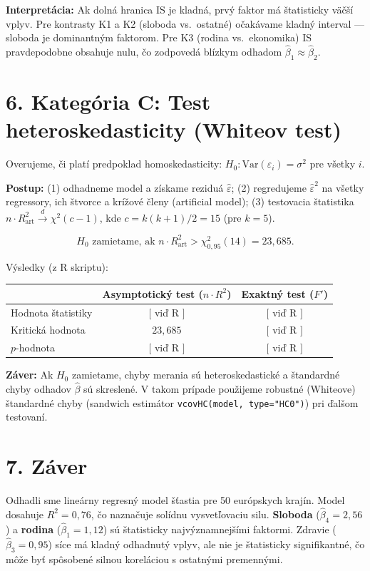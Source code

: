 \documentclass[12pt,a4paper]{article}
\begin{document}
\textbf{Interpretácia:} Ak dolná hranica IS je kladná, prvý faktor
má štatisticky väčší vplyv. Pre kontrasty K1 a K2 (sloboda vs.\ ostatné)
očakávame kladný interval --- sloboda je dominantným faktorom.
Pre K3 (rodina vs.\ ekonomika) IS pravdepodobne obsahuje nulu,
čo zodpovedá blízkym odhadom $\hat{\beta}_1 \approx \hat{\beta}_2$.

\section*{6. Kategória C: Test heteroskedasticity (Whiteov test)}

Overujeme, či platí predpoklad homoskedasticity:
$H_0\colon \mathrm{Var}(\varepsilon_i) = \sigma^2$ pre všetky $i$.

\textbf{Postup:} (1) odhadneme model a získame reziduá $\hat{\varepsilon}$;
(2) regredujeme $\hat{\varepsilon}^2$ na všetky regressory, ich štvorce
a krížové členy (artificial model); (3) testovacia štatistika
$n \cdot R^2_{\text{art}} \xrightarrow{d} \chi^2(c-1)$,
kde $c = k(k+1)/2 = 15$ (pre $k=5$).

\[
  H_0\text{ zamietame, ak } n \cdot R^2_{\text{art}} > \chi^2_{0{,}95}(14) = 23{,}685.
\]

Výsledky (z R skriptu):

\medskip
\begin{tabular}{lcc}
\toprule
& Asymptotický test ($n \cdot R^2$) & Exaktný test ($F'$) \\
\midrule
Hodnota štatistiky & $[$ viď R $]$ & $[$ viď R $]$ \\
Kritická hodnota   & $23{,}685$ & $[$ viď R $]$ \\
$p$-hodnota        & $[$ viď R $]$ & $[$ viď R $]$ \\
\bottomrule
\end{tabular}

\medskip
\textbf{Záver:} Ak $H_0$ zamietame, chyby merania sú heteroskedastické
a štandardné chyby odhadov $\hat{\beta}$ sú skreslené.
V takom prípade použijeme robustné (Whiteove) štandardné chyby
(sandwich estimátor \texttt{vcovHC(model, type="HC0")}) pri ďalšom testovaní.

\section*{7. Záver}

Odhadli sme lineárny regresný model šťastia pre 50 európskych krajín.
Model dosahuje $R^2 = 0{,}76$, čo naznačuje solídnu vysvetľovaciu silu.
\textbf{Sloboda} ($\hat{\beta}_4 = 2{,}56$) a \textbf{rodina}
($\hat{\beta}_1 = 1{,}12$) sú štatisticky najvýznamnejšími faktormi.
Zdravie ($\hat{\beta}_3 = 0{,}95$) síce má kladný odhadnutý vplyv,
ale nie je štatisticky signifikantné, čo môže byť spôsobené silnou
koreláciou s ostatnými premennými.
\end{document}
